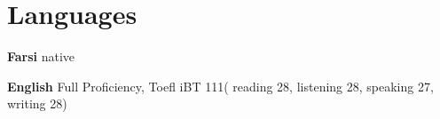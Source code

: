 
\section{Languages}
\begin{compactitem} 
	\item \textbf{Farsi} native 
	\item \textbf{English} Full Proficiency, Toefl iBT 111( reading 28, listening 28, speaking 27, writing 28)
\end{compactitem}